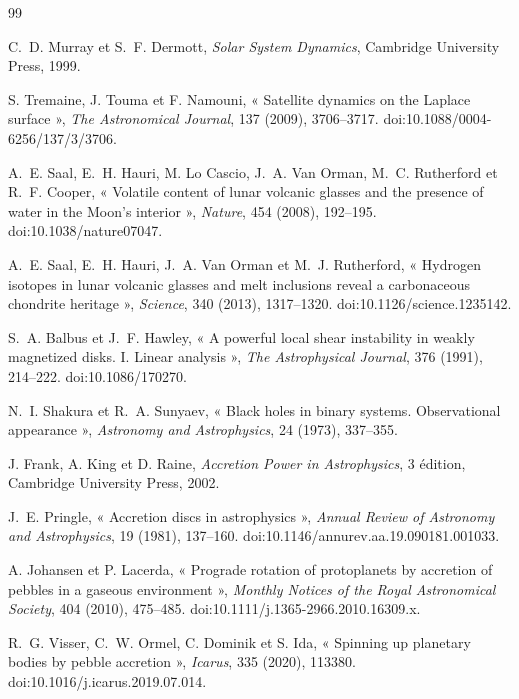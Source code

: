 \documentclass[11pt,a4paper,openany]{report}
\begin{document}
\clearpage
{}
{}
\begin{thebibliography}{99}
\small

 C.~D. Murray et S.~F. Dermott, \emph{Solar System Dynamics},
Cambridge University Press, 1999.

 S. Tremaine, J. Touma et F. Namouni, « Satellite dynamics on the
Laplace surface », \emph{The Astronomical Journal}, 137 (2009), 3706--3717.
doi:10.1088/0004-6256/137/3/3706.

 A.~E. Saal, E.~H. Hauri, M. Lo Cascio, J.~A. Van Orman, M.~C. Rutherford et
R.~F. Cooper, « Volatile content of lunar volcanic glasses and the presence of water in the Moon's
interior », \emph{Nature}, 454 (2008), 192--195. doi:10.1038/nature07047.

 A.~E. Saal, E.~H. Hauri, J.~A. Van Orman et M.~J. Rutherford, « Hydrogen
isotopes in lunar volcanic glasses and melt inclusions reveal a carbonaceous chondrite heritage »,
\emph{Science}, 340 (2013), 1317--1320. doi:10.1126/science.1235142.

 S.~A. Balbus et J.~F. Hawley, « A powerful local shear instability in
weakly magnetized disks. I. Linear analysis », \emph{The Astrophysical Journal}, 376 (1991),
214--222. doi:10.1086/170270.

 N.~I. Shakura et R.~A. Sunyaev, « Black holes in binary systems.
Observational appearance », \emph{Astronomy and Astrophysics}, 24 (1973), 337--355.

 J. Frank, A. King et D. Raine, \emph{Accretion Power in Astrophysics},
3\ieme{} édition, Cambridge University Press, 2002.

 J.~E. Pringle, « Accretion discs in astrophysics », \emph{Annual Review of
Astronomy and Astrophysics}, 19 (1981), 137--160. doi:10.1146/annurev.aa.19.090181.001033.

 A. Johansen et P. Lacerda, « Prograde rotation of protoplanets by
accretion of pebbles in a gaseous environment », \emph{Monthly Notices of the Royal Astronomical
Society}, 404 (2010), 475--485. doi:10.1111/j.1365-2966.2010.16309.x.

 R.~G. Visser, C.~W. Ormel, C. Dominik et S. Ida, « Spinning up planetary
bodies by pebble accretion », \emph{Icarus}, 335 (2020), 113380. doi:10.1016/j.icarus.2019.07.014.


\end{thebibliography}
\end{document}
